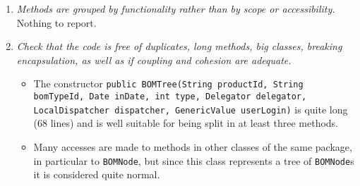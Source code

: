 \begin{enumerate}
			\item \textit{Methods are grouped by functionality rather than by scope or accessibility.}\newline
			Nothing to report. %

			\item \textit{Check that the code is free of duplicates, long methods, big classes, breaking encapsulation, as well as if coupling and cohesion are adequate.}
			\begin{itemize}
				\item The constructor \texttt{public BOMTree(String productId, String bomTypeId, Date inDate, int type, Delegator delegator, LocalDispatcher dispatcher, GenericValue userLogin)} is quite long (68 lines) and is well suitable for being split in at least three methods.
				\item Many accesses are made to methods in other classes of the same package, in particular to \texttt{BOMNode}, but since this class represents a tree of \texttt{BOMNode}s it is considered quite normal.
			\end{itemize}
		\end{enumerate}

